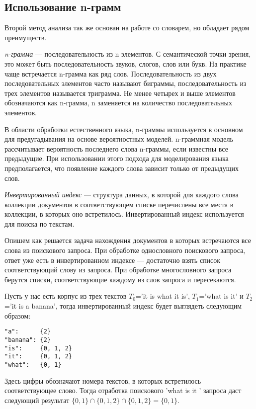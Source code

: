 \subsection{Использование n-грамм}
Второй метод анализа так же основан на работе со словарем, 
но обладает рядом преимуществ.

\DEF\textit{n-грамма} — последовательность из n элементов. С 
семантической точки зрения, это может быть последовательность 
звуков, слогов, слов или букв. На практике чаще встречается 
n-грамма как ряд слов. Последовательность из двух последовательных 
элементов часто называют биграммы, последовательность из трех 
элементов называется триграмма. Не менее четырех и выше элементов 
обозначаются как n-грамма, n заменяется на количество последовательных 
элементов.

В области обработки естественного языка, n-граммы используется 
в основном для предугадывания на основе вероятностных моделей. 
n-граммная модель рассчитывает вероятность последнего слова 
n-граммы, если известны все предыдущие. При использовании этого 
подхода для моделирования языка предполагается, что появление 
каждого слова зависит только от предыдущих слов.

\DEF\textit{Инвертированный индекс} — структура данных, в которой 
для каждого слова коллекции документов в соответствующем списке 
перечислены все места в коллекции, в которых оно встретилось. 
Инвертированный индекс используется для поиска по текстам.

Опишем как решается задача нахождения документов в которых встречаются 
все слова из поискового запроса. При обработке однословного поискового 
запроса, ответ уже есть в инвертированном индексе — достаточно 
взять список соответствующий слову из запроса. При обработке 
многословного запроса берутся списки, соответствующие каждому 
из слов запроса и пересекаются.

Пусть у нас есть корпус из трех текстов $T_0$='it is what it is', 
$T_1$='what is it' и $T_2$='it is a banana', тогда инвертированный 
индекс будет выглядеть следующим образом:

\begin{verbatim}
"a":      {2}
"banana": {2}
"is":     {0, 1, 2}
"it":     {0, 1, 2}
"what":   {0, 1}
\end{verbatim}

Здесь цифры обозначают номера текстов, в которых встретилось 
соответствующее слово. Тогда отработка поискового 'what is it
' запроса даст следующий результат $\{0,1\} \cap \{0,1,2\} \cap 
\{0,1,2\} = \{0,1\}$.

